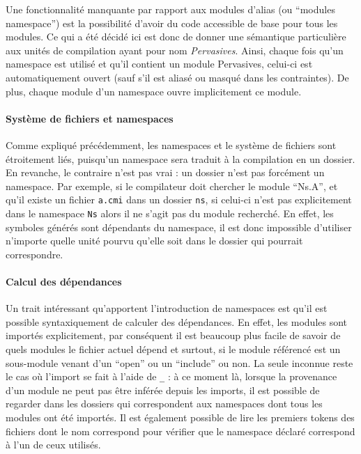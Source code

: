 \documentclass[11pt,a4paper]{report}
\begin{document}
Une fonctionnalité manquante par rapport aux modules d'alias (ou ``modules
namespace'') est la possibilité d'avoir du code accessible de base pour tous les
modules. Ce qui a été décidé ici est donc de donner une sémantique particulière
aux unités de compilation ayant pour nom \emph{Pervasives}. Ainsi, chaque fois
qu'un namespace est utilisé et qu'il contient un module Pervasives, celui-ci est
automatiquement ouvert (sauf s'il est aliasé ou masqué dans les contraintes). De
plus, chaque module d'un namespace ouvre implicitement ce module.

\paragraph{Système de fichiers et namespaces}

Comme expliqué précédemment, les namespaces et le système de fichiers sont
étroitement liés, puisqu'un namespace sera traduit à la compilation en un
dossier. En revanche, le contraire n'est pas vrai : un dossier n'est pas
forcément un namespace. Par exemple, si le compilateur doit chercher le module
``Ns.A'', et qu'il existe un fichier \texttt{a.cmi} dans un dossier \texttt{ns},
si celui-ci n'est pas explicitement dans le namespace \texttt{Ns} alors il ne
s'agit pas du module recherché. En effet, les symboles générés sont dépendants
du namespace, il est donc impossible d'utiliser n'importe quelle unité pourvu
qu'elle soit dans le dossier qui pourrait correspondre. 


\paragraph{Calcul des dépendances}

Un trait intéressant qu'apportent l'introduction de namespaces est qu'il est
possible syntaxiquement de calculer des dépendances. En effet, les modules sont
importés explicitement, par conséquent il est beaucoup plus facile de savoir de
quels modules le fichier actuel dépend et surtout, si le module référencé est un
sous-module venant d'un ``open'' ou un ``include'' ou non. La seule inconnue
reste le cas où l'import se fait à l'aide de \texttt{_} : à ce moment là,
lorsque la provenance d'un module ne peut pas être inférée depuis les imports,
il est possible de regarder dans les dossiers qui correspondent aux namespaces
dont tous les modules ont été importés. Il est également possible de lire les
premiers tokens des fichiers dont le nom correspond pour vérifier que le
namespace déclaré correspond à l'un de ceux utilisés.
\end{document}

